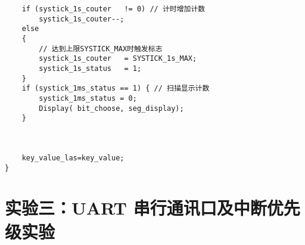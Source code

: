 \documentclass[12pt, a4paper, oneside]{ctexart}
\begin{document}
\begin{enumerate}[listparindent=2em]
\begin{lstlisting}
    if (systick_1s_couter	!= 0) // 计时增加计数
	    systick_1s_couter--;
    else
    {
        // 达到上限SYSTICK_MAX时触发标志
	    systick_1s_couter	= SYSTICK_1s_MAX; 
	    systick_1s_status 	= 1;
    }
    if (systick_1ms_status == 1) { // 扫描显示计数
        systick_1ms_status = 0;
        Display( bit_choose, seg_display); 
    }

   

    key_value_las=key_value;
}
\end{lstlisting}
    \end{enumerate}
    
    \section{实验三：UART 串行通讯口及中断优先级实验}
\end{document}
